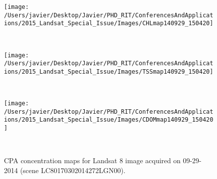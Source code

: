 \begin{figure}[htbp!]
  \begin{minipage}[c]{1.0\linewidth}
      \centering
      \texttt{[image: /Users/javier/Desktop/Javier/PHD\_RIT/ConferencesAndApplications/2015\_Landsat\_Special\_Issue/Images/CHLmap140929\_150420]}  
  \end{minipage}\\

  \begin{minipage}[c]{1.0\linewidth}
      \centering
      \texttt{[image: /Users/javier/Desktop/Javier/PHD\_RIT/ConferencesAndApplications/2015\_Landsat\_Special\_Issue/Images/TSSmap140929\_150420]}  
  \end{minipage}\\

  \begin{minipage}[c]{1.0\linewidth}
      \centering
      \texttt{[image: /Users/javier/Desktop/Javier/PHD\_RIT/ConferencesAndApplications/2015\_Landsat\_Special\_Issue/Images/CDOMmap140929\_150420]}  
  \end{minipage}\\

  \caption{CPA concentration maps for Landsat 8 image acquired on 09-29-2014 (scene LC80170302014272LGN00).\label{fig:CPAsMaps140929} } 
\end{figure}


